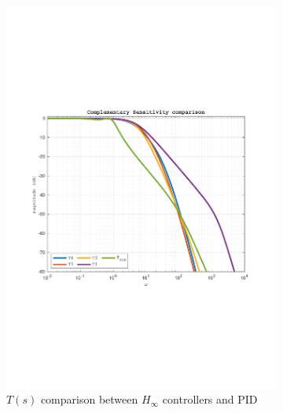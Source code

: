 \documentclass[a4paper, 12pt]{article}
\begin{document}
\begin{figure}[h!]
\begin{subfigure}[t]{0.32\textwidth}
           \includegraphics[width=\textwidth]
           {Figures/fig03b.pdf}
           \captionsetup{margin=2mm}
           \caption{$T(s)$ comparison between $H_\infty$ controllers and PID}
           \label{fig:fig03b}
       \end{subfigure}
       \begin{subfigure}[t]{0.32\textwidth}

\end{subfigure}
\end{figure}
\end{document}
